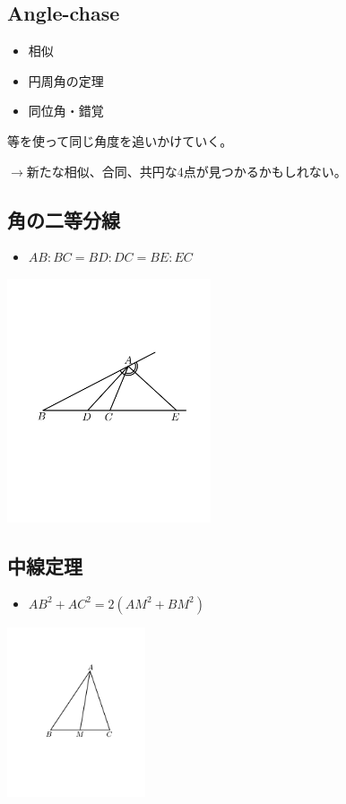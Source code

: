\documentclass[uplatex,dvipdfmx]{jsbook}
\begin{document}
\subsection{Angle-chase}
\begin{itemize}
    \item 相似
    \item 円周角の定理
    \item 同位角・錯覚
\end{itemize}

等を使って同じ角度を追いかけていく。

$\rightarrow$新たな相似、合同、共円な4点が見つかるかもしれない。

\subsection{角の二等分線}
\begin{itemize}
    \item $AB:BC=BD:DC=BE:EC$
\end{itemize}

\includegraphics[clip,width=6cm]{figures/nitobun.pdf}

\subsection{中線定理}
\begin{itemize}
    \item $AB^2+AC^2=2\left(AM^2+BM^2\right)$
\end{itemize}

\includegraphics[clip,height=5cm]{figures/chusen.pdf}
\end{document}
